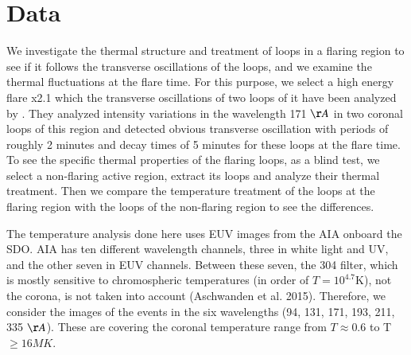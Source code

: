 \documentclass[oneside,onecolumn]{article}
\begin{document}
\section{Data}\label{sect:Obs}

We investigate the thermal structure and treatment of loops in a flaring region to see if it follows the transverse oscillations of the loops, and we examine the thermal fluctuations at the flare time. For this purpose, we select a high energy flare x2.1 which the transverse oscillations of two loops of it have been analyzed by \citet{ref:Jain2015}. They analyzed intensity variations in the wavelength 171 $\AA$ in two coronal loops of this region and detected obvious transverse oscillation with periods of roughly 2 minutes and decay times of 5 minutes for these loops at the flare time. To see the specific thermal properties of the flaring loops, as a blind test, we select a non-flaring active region, extract its loops and analyze their thermal treatment. Then we compare the temperature treatment of the loops at the flaring region with the loops of the non-flaring region to see the differences. 

The temperature analysis done here uses EUV images from the AIA onboard the SDO. AIA has ten different wavelength channels, three in white light and UV, and the other seven in EUV channels. Between these seven, the 304 filter, which is mostly sensitive to chromospheric temperatures (in order of $T=10^{4.7}$K), not the corona, is not taken into account (Aschwanden et al. 2015). Therefore, we consider the images of the events in the six wavelengths (94, 131, 171, 193, 211, 335 $\AA$). These are covering the coronal temperature range from $T\approx 0.6$ to T $\geq 16MK$.
\end{document}
